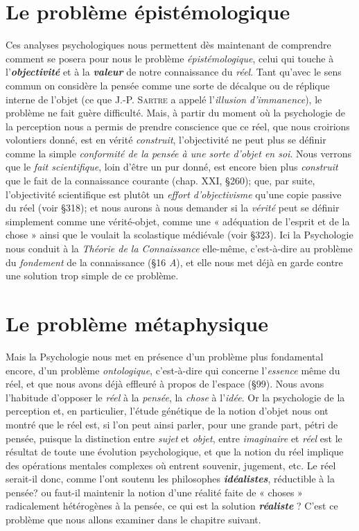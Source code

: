 \section{Le problème épistémologique}%
Ces analyses psychologiques
nous permettent dès maintenant de comprendre comment se
posera pour nous le problème {\it épistémologique}, celui qui touche à
l’\textbf{\textit {objectivité}} et à la \textbf{\textit {valeur}} de notre connaissance du {\it réel}. Tant qu'avec
le sens commun on considère la pensée comme une sorte de décalque
ou de réplique interne de l’objet (ce que J.-P. \textsc{Sartre} a appelé
l'{\it illusion d’immanence}), le problème ne fait guère difficulté. Mais, à
partir du moment où la psychologie de la perception nous a permis
de prendre conscience que ce réel, que nous croirions volontiers donné,
est en vérité {\it construit}, l’objectivité ne peut plus se définir comme la
simple {\it conformité de la pensée à une sorte d'objet en soi}. Nous verrons
que le {\it fait scientifique}, loin d’être un pur donné, est encore bien plus
{\it construit} que le fait de la connaissance courante (chap. XXI, \S 260); que,
par suite, l’objectivité scientifique est plutôt un {\it effort d’objectivisme}
qu’une copie passive du réel (voir \S 318); et nous aurons à nous
demander si la {\it vérité} peut se définir simplement comme une vérité-objet,
comme une « adéquation de l'esprit et de la chose » ainsi que
le voulait la scolastique médiévale (voir \S 323). Ici la Psychologie
nous conduit à la {\it Théorie de la Connaissance} elle-même, c’est-à-dire
au problème du {\it fondement} de la connaissance (\S 16 {\it A}), et elle nous
met déjà en garde contre une solution trop simple de ce problème.

\section{Le problème métaphysique}%
Mais la Psychologie nous
met en présence d’un problème plus fondamental encore, d’un problème
{\it ontologique}, c’est-à-dire qui concerne l’{\it essence} même du réel, et
que nous avons déjà effleuré à propos de l’espace (\S 99). Nous avons
l’habitude d’opposer le {\it réel} à la {\it pensée}, la {\it chose} à l’{\it idée}. Or la psychologie
de la perception et, en particulier, l'étude génétique de la notion
d’objet nous ont montré que le réel est, si l’on peut ainsi parler, pour
une grande part, pétri de pensée, puisque la distinction entre {\it sujet}
et {\it objet}, entre {\it imaginaire} et {\it réel} est le résultat de toute une évolution
psychologique, et que la notion du réel implique des opérations
mentales complexes où entrent souvenir, jugement, etc. Le réel
serait-il donc, comme l’ont soutenu les philosophes \textbf{\textit {idéalistes}}, réductible
à la pensée? ou faut-il maintenir la notion d’une réalité faite
de « choses » radicalement hétérogènes à la pensée, ce qui est la solution
\textbf{\textit {réaliste}} ? C’est ce problème que nous allons examiner dans le
chapitre suivant.

